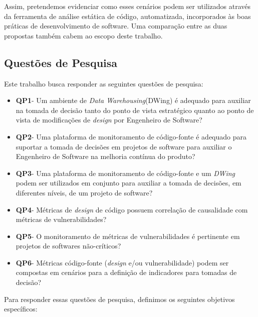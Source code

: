 Assim, pretendemos evidenciar como esses cenários podem ser utilizados através da ferramenta de análise estática de código, automatizada, incorporados às boas práticas de desenvolvimento de software. Uma comparação entre as duas propostas também cabem ao escopo deste trabalho.

%

\subsection{Questões de Pesquisa}

%

Este trabalho busca responder as seguintes questões de pesquisa:

%

\begin{itemize}

\item \textbf{QP1}- Um ambiente de \emph{Data Warehousing}(DWing) é  adequado para auxiliar na tomada de decisão tanto do ponto de vista estratégico quanto ao ponto de vista de modificações de \emph{design} por Engenheiro de Software?
%
\item \textbf{QP2}- Uma plataforma de monitoramento de código-fonte é adequado para suportar a tomada de decisões em projetos de software para auxiliar o Engenheiro de Software na melhoria contínua do produto?
%
\item \textbf{QP3}- Uma plataforma de monitoramento de código-fonte e um \emph{DWing} podem ser utilizados em conjunto para auxiliar a tomada de decisões, em diferentes níveis, de um projeto de software?
%
\item \textbf{QP4}- Métricas de \emph{design} de código possuem correlação de causalidade com métricas de vulnerabilidades?
%
\item \textbf{QP5}- O monitoramento de métricas de vulnerabilidades é pertinente em projetos de softwares não-críticos?
%
\item \textbf{QP6}- Métricas código-fonte (\emph{design} e/ou vulnerabilidade) podem ser compostas em cenários para a definição de indicadores para tomadas de decisão?

\end{itemize}

%

Para responder essas questões de pesquisa, definimos os seguintes objetivos específicos:

